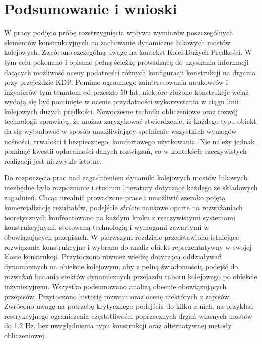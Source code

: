 \chapter*{Podsumowanie i wnioski}

W pracy podjęto próbę rozstrzygnięcia wpływu wymiarów poszczególnych elementów konstrukcyjnych na zachowanie dynamiczne łukowych mostów kolejowych. Zwrócono szczególną uwagę na kontekst Kolei Dużych Prędkości. W tym celu pokonano i opisano pełną ścieżkę prowadzącą do uzyskania informacji dających możliwość oceny podatności różnych konfiguracji konstrukcji na drgania przy przejeździe KDP. Pomimo ogromnego zainteresowania naukowców i inżynierów tym tematem od przeszło 50 lat, niektóre złożone konstrukcje wciąż wydają się być pominięte w ocenie przydatności wykorzystania w ciągu linii kolejowych dużych prędkości. Nowoczesne techniki obliczeniowe oraz rozwój technologii sprawiają, że można zaryzykować stwierdzenie, iż każdego typu obiekt da się wybudować w sposób umożliwiający spełnienie wszystkich wymogów nośności, trwałości i bezpiecznego, komfortowego użytkowania. Nie należy jednak pominąć kwestii opłacalności danych rozwiązań, co w kontekście rzeczywistych realizacji jest niezwykle istotne.

Do rozpoczęcia prac nad zagadnieniem dynamiki kolejowych mostów łukowych niezbędne było rozpoznanie i studium literatury dotyczące każdego ze składowych zagadnień. Chcąc urealnić prowadzone prace i umożliwić szeroko pojętą komercjalizację rezultatów, podejście \textit{stricte} naukowe oparte na rozważaniach teoretycznych konfrontowano na każdym kroku z rzeczywistymi systemami konstrukcyjnymi, stosowaną technologią i wymogami zawartymi w obowiązujących przepisach. W pierwszym rozdziale przedstawiono istniejące rozwiązania konstrukcyjne i wybrano do analiz obiekt reprezentatywny w swojej klasie konstrukcji. Przytoczono również wiedzę dotyczącą oddziaływań dynamicznych na obiekcie kolejowym, aby z pełną świadomością podejść do rozważań badania efektów dynamicznych przejazdu taboru kolejowego po obiekcie inżynieryjnym. Wszystko podsumowano analizą obecnie obowiązujących przepisów. Przytoczono historię rozwoju oraz ocenę niektórych z zapisów. Zwrócono uwagę na potrzebę krytycznego podejścia do kilku z nich, na przykład restrykcyjnego ograniczenia częstotliwości poprzecznych drgań własnych mostów do 1.2 Hz, bez uwzględnienia typu konstrukcji oraz alternatywnej metody obliczeniowej.

